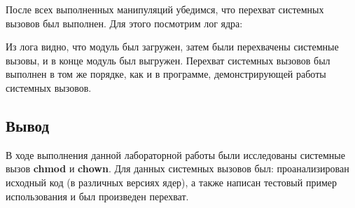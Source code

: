 


\par После всех выполненных манипуляций убедимся, что перехват системных вызовов был выполнен. Для этого посмотрим лог ядра:



\par Из лога видно, что модуль был загружен, затем были перехвачены системные вызовы, и в конце модуль был выгружен. Перехват системных вызовов был выполнен в том же порядке, как и в программе, демонстрирующей работы системных вызовов.

\subsection{Вывод} %
\par В ходе выполнения данной лабораторной работы были исследованы системные вызов \textbf{chmod} и \textbf{chown}. Для данных системных вызовов был: проанализирован исходный код (в различных версиях ядер), а также написан тестовый пример использования и был произведен перехват.

\clearpage



